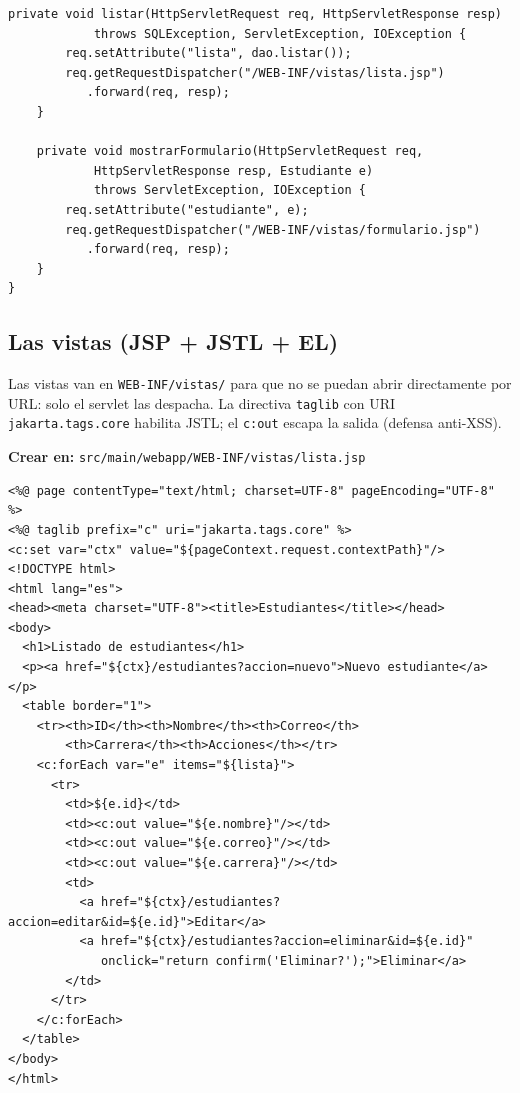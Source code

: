 \begin{lstlisting}[style=java,caption={EstudianteServlet.java (control de la peticion)},label={lst:jsp-servlet}]
    private void listar(HttpServletRequest req, HttpServletResponse resp)
            throws SQLException, ServletException, IOException {
        req.setAttribute("lista", dao.listar());
        req.getRequestDispatcher("/WEB-INF/vistas/lista.jsp")
           .forward(req, resp);
    }

    private void mostrarFormulario(HttpServletRequest req,
            HttpServletResponse resp, Estudiante e)
            throws ServletException, IOException {
        req.setAttribute("estudiante", e);
        req.getRequestDispatcher("/WEB-INF/vistas/formulario.jsp")
           .forward(req, resp);
    }
}
\end{lstlisting}

\subsection{Las vistas (JSP + JSTL + EL)}
\label{ap:crud:jsp:vistas}

Las vistas van en \texttt{WEB-INF/vistas/} para que no se puedan abrir
directamente por URL: solo el servlet las despacha. La directiva
\texttt{taglib} con URI \texttt{jakarta.tags.core} habilita JSTL; el
\texttt{c:out} escapa la salida (defensa anti-XSS).

{\small\textbf{Crear en:} \texttt{src/main/webapp/WEB-INF/vistas/lista.jsp}}
\begin{lstlisting}[style=html,caption={lista.jsp (listado con JSTL y EL)},label={lst:jsp-lista}]
<%@ page contentType="text/html; charset=UTF-8" pageEncoding="UTF-8" %>
<%@ taglib prefix="c" uri="jakarta.tags.core" %>
<c:set var="ctx" value="${pageContext.request.contextPath}"/>
<!DOCTYPE html>
<html lang="es">
<head><meta charset="UTF-8"><title>Estudiantes</title></head>
<body>
  <h1>Listado de estudiantes</h1>
  <p><a href="${ctx}/estudiantes?accion=nuevo">Nuevo estudiante</a></p>
  <table border="1">
    <tr><th>ID</th><th>Nombre</th><th>Correo</th>
        <th>Carrera</th><th>Acciones</th></tr>
    <c:forEach var="e" items="${lista}">
      <tr>
        <td>${e.id}</td>
        <td><c:out value="${e.nombre}"/></td>
        <td><c:out value="${e.correo}"/></td>
        <td><c:out value="${e.carrera}"/></td>
        <td>
          <a href="${ctx}/estudiantes?accion=editar&id=${e.id}">Editar</a>
          <a href="${ctx}/estudiantes?accion=eliminar&id=${e.id}"
             onclick="return confirm('Eliminar?');">Eliminar</a>
        </td>
      </tr>
    </c:forEach>
  </table>
</body>
</html>
\end{lstlisting}

